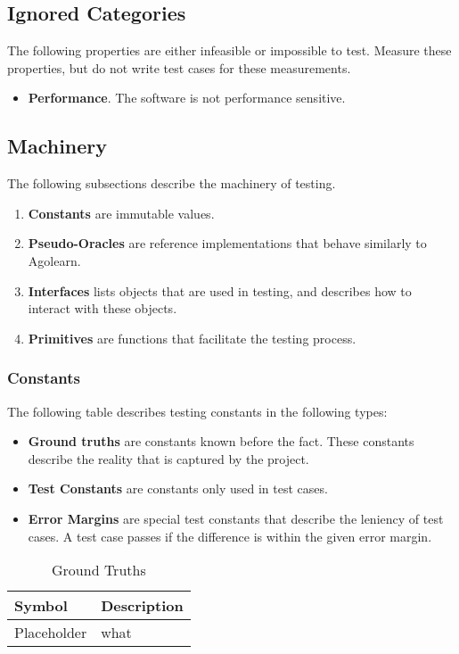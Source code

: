 \documentclass[12pt, titlepage]{article}
\begin{document}
\subsection{Ignored Categories}
The following properties are either infeasible or impossible to test. Measure these properties, but do not write test cases for these measurements.
\begin{itemize}
  \item \textbf{Performance}. The software is not performance sensitive.
\end{itemize}

\subsection{Machinery}
The following subsections describe the machinery of testing.
\begin{enumerate}
  \item \textbf{Constants} are immutable values.
  \item \textbf{Pseudo-Oracles} are reference implementations that behave similarly to Agolearn.
  \item \textbf{Interfaces} lists objects that are used in testing, and describes how to interact with these objects.
  \item \textbf{Primitives} are functions that facilitate the testing process.
\end{enumerate}

\subsubsection{Constants}
The following table describes testing constants in the following types:

\begin{itemize}
  \item \textbf{Ground truths} are constants known before the fact. These constants describe the reality that is captured by the project.
  \item \textbf{Test Constants} are constants only used in test cases.
  \item \textbf{Error Margins} are special test constants that describe the leniency of test cases. A test case passes if the difference is within the given error margin.
\end{itemize}


\begin{table}[!h]
  \caption{Ground Truths}
  \label{table:ground-truths}
  \begin{tabularx}{\textwidth}{p{3cm}X}
    \toprule {\bf Symbol} & {\bf Description}\\
    \midrule
    Placeholder & what \\
    \bottomrule
  \end{tabularx}
\end{table}
\end{document}
